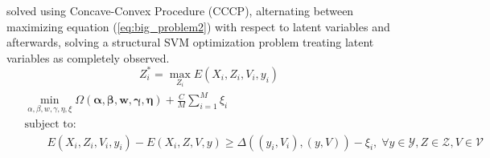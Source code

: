 \documentclass[10pt,letterpaper]{article}
\newcommand{\+}[1]{\ensuremath{{\boldsymbol #1}}}
\begin{document}
solved using Concave-Convex Procedure (CCCP), alternating between maximizing
equation (\ref{eq:big_problem2}) with respect to latent variables and afterwards,
solving a structural SVM optimization problem treating
latent variables as completely observed. 
\begin{equation}
 Z_i^* = \max_{Z_i} E(X_i, Z_i, V_i, y_i)
\end{equation} 
\begin{align}
\label{eq:big_problem2}
\begin{split}
& \min_{\alpha, \beta, w,\gamma,\eta, \xi}
      \Omega(\+{\alpha},\+{\beta},\+{w},\+{\gamma},\+{\eta})
 + \frac{C}{M} \sum_{i=1}^M \xi_i \\
& \text{subject to:} \\
& \quad\quad  E(X_i, Z_i, V_i, y_i) - E(X_i, Z, V, y)
      \geq \Delta( (y_i, V_i), (y, V)) - \xi_i, \;
      \forall y \in \mathcal{Y}, Z \in \mathcal{Z},
      V \in \mathcal{V}
\end{split}
\end{align}




\end{document}
